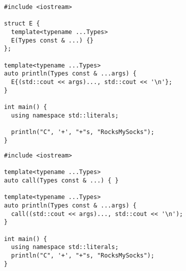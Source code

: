 \begin{frame}[fragile]
  \begin{lstlisting}
#include <iostream>

struct E {
  template<typename ...Types>
  E(Types const & ...) {}
};

template<typename ...Types>
auto println(Types const & ...args) {
  E{(std::cout << args)..., std::cout << '\n'};
}

int main() {
  using namespace std::literals;

  println("C", '+', "+"s, "RocksMySocks");
}
  \end{lstlisting}
\end{frame}
\begin{frame}[fragile]
  \begin{lstlisting}
#include <iostream>

template<typename ...Types>
auto call(Types const & ...) { }

template<typename ...Types>
auto println(Types const & ...args) {
  call((std::cout << args)..., std::cout << '\n');
}

int main() {
  using namespace std::literals;
  println("C", '+', "+"s, "RocksMySocks");
}
  \end{lstlisting}
\end{frame}
